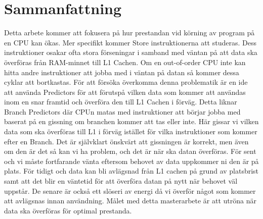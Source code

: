 \chapter*{Sammanfattning}
Detta arbete kommer att fokusera på hur prestandan vid körning av program på en
CPU kan ökas. Mer specifikt kommer Store instruktionerna att studeras. Dess instruktioner osakar ofta stora förseningar i samband med väntan på att data ska
överföras från RAM-minnet till L1 Cachen. Om en out-of-order CPU inte kan hitta
andre instruktioner att jobba med i väntan på datan så kommer dessa cyklar att
bortkastas. För att försöka överkomma denna problematik är en ide att använda Predictors för att förutspå vilken
data som kommer att användas inom en snar framtid och överföra den till L1 Cachen i
förväg. Detta liknar Branch Predictors där CPUn matas med
instruktioner att börjar jobba med baserat på en gissning om branchen kommer att tas
eller inte. Här gissar vi vilken data som ska överföras till L1 i förväg istället för vilka
instruktioner som kommer efter en Branch. Det är självklart önskvärt att gissningen är
korrekt, men även om den är det så kan vi ha problem, och det är när ska datan överföras. För
sent och vi måste fortfarande vänta eftersom behovet av data uppkommer ni den är
på plats. För tidigt och data kan bli avlägsnad från L1 cachen på grund av platsbrist
samt att det blir en väntetid för att överföra datan på nytt när behovet väl uppstår. De
senare är också ett slöseri av energi då vi överför något som kommer att avlägsnas
innan användning. Målet med detta masterarbete är att utröna när data ska överföras för optimal
prestanda.
\newpage